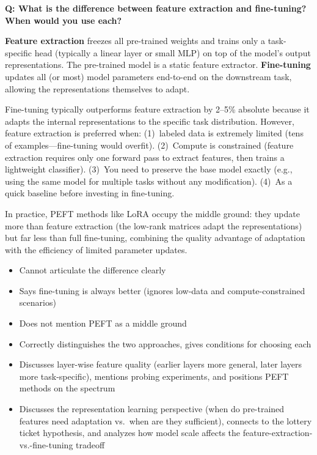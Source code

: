 \begin{interviewq}
\textbf{Q: What is the difference between feature extraction and fine-tuning?
When would you use each?}

 \quad {} \quad \badgefreq{\freqmed}

\stronganswer
\textbf{Feature extraction} freezes all pre-trained weights and trains only a
task-specific head (typically a linear layer or small MLP) on top of the model's
output representations.  The pre-trained model is a static feature extractor.
\textbf{Fine-tuning} updates all (or most) model parameters end-to-end on the
downstream task, allowing the representations themselves to adapt.

Fine-tuning typically outperforms feature extraction by 2--5\% absolute because
it adapts the internal representations to the specific task distribution.  However,
feature extraction is preferred when: (1)~labeled data is extremely limited
(tens of examples---fine-tuning would overfit). (2)~Compute is constrained
(feature extraction requires only one forward pass to extract features, then
trains a lightweight classifier). (3)~You need to preserve the base model
exactly (e.g., using the same model for multiple tasks without any modification).
(4)~As a quick baseline before investing in fine-tuning.

In practice, PEFT methods like LoRA occupy the middle ground: they update more
than feature extraction (the low-rank matrices adapt the representations) but far
less than full fine-tuning, combining the quality advantage of adaptation with the
efficiency of limited parameter updates.

\redflags
\begin{itemize}
    \item Cannot articulate the difference clearly
    \item Says fine-tuning is always better (ignores low-data and compute-constrained
          scenarios)
    \item Does not mention PEFT as a middle ground
\end{itemize}


\goodgreat
\begin{itemize}
    \item {} Correctly distinguishes the two approaches, gives conditions
          for choosing each
    \item {} Discusses layer-wise feature quality (earlier layers more
          general, later layers more task-specific), mentions probing experiments, and
          positions PEFT methods on the spectrum
    \item {} Discusses the representation learning perspective (when do
          pre-trained features need adaptation vs.\ when are they sufficient), connects
          to the lottery ticket hypothesis, and analyzes how model scale affects the
          feature-extraction-vs.-fine-tuning tradeoff
\end{itemize}


\end{interviewq}
